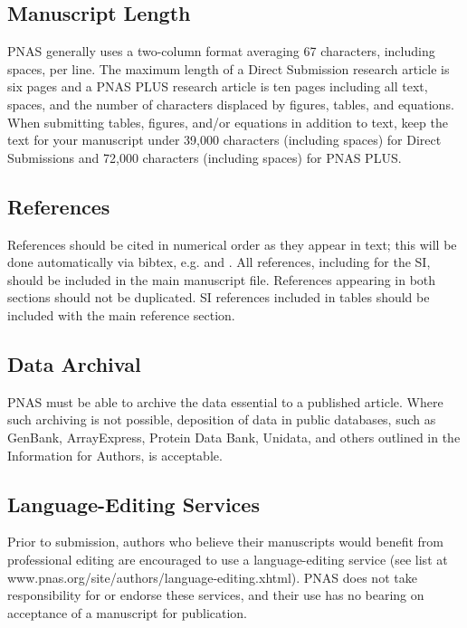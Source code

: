 \documentclass[9pt,twocolumn,twoside,lineno]{pnas-new}
\begin{document}
\subsection*{Manuscript Length}

PNAS generally uses a two-column format averaging 67 characters, including spaces, per line. The maximum length of a Direct Submission research article is six pages and a PNAS PLUS research article is ten pages including all text, spaces, and the number of characters displaced by figures, tables, and equations.  When submitting tables, figures, and/or equations in addition to text, keep the text for your manuscript under 39,000 characters (including spaces) for Direct Submissions and 72,000 characters (including spaces) for PNAS PLUS.

\subsection*{References}

References should be cited in numerical order as they appear in text; this will be done automatically via bibtex, e.g. \cite{belkin2002using} and \cite{berard1994embedding,coifman2005geometric}. All references, including for the SI, should be included in the main manuscript file. References appearing in both sections should not be duplicated.  SI references included in tables should be included with the main reference section.

\subsection*{Data Archival}

PNAS must be able to archive the data essential to a published article. Where such archiving is not possible, deposition of data in public databases, such as GenBank, ArrayExpress, Protein Data Bank, Unidata, and others outlined in the Information for Authors, is acceptable.

\subsection*{Language-Editing Services}
Prior to submission, authors who believe their manuscripts would benefit from professional editing are encouraged to use a language-editing service (see list at www.pnas.org/site/authors/language-editing.xhtml). PNAS does not take responsibility for or endorse these services, and their use has no bearing on acceptance of a manuscript for publication.
\end{document}
